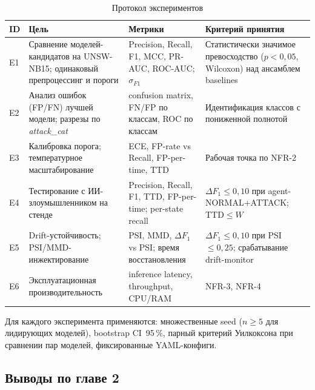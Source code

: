 \begin{table}[H]
\centering
\caption{Протокол экспериментов}
\label{tab:experiments}
\renewcommand{\arraystretch}{1.2}
\setlength{\tabcolsep}{4pt}
\small
\begin{tabularx}{\linewidth}{@{}lXXX@{}}
\toprule
\textbf{ID} & \textbf{Цель} & \textbf{Метрики} & \textbf{Критерий принятия} \\
\midrule
E1 &
Сравнение моделей-кандидатов на UNSW-NB15; одинаковый препроцессинг
и пороги &
Precision, Recall, F1, MCC, PR-AUC, ROC-AUC; $\sigma_{F1}$ &
Статистически значимое превосходство (\(p < 0{,}05\), Wilcoxon)
над ансамблем baselines \\
\addlinespace
E2 &
Анализ ошибок (FP/FN) лучшей модели; разрезы по \emph{attack\_cat} &
confusion matrix, FN/FP по классам, ROC по классам &
Идентификация классов с пониженной полнотой \\
\addlinespace
E3 &
Калибровка порога; температурное масштабирование &
ECE, FP-rate vs Recall, FP-per-time, TTD &
Рабочая точка по NFR-2 \\
\addlinespace
E4 &
Тестирование с ИИ-злоумышленником на стенде &
Precision, Recall, F1, TTD, FP-per-time; per-state recall &
$\Delta F_1 \leq 0{,}10$ при agent-NORMAL+ATTACK; TTD$\leq W$ \\
\addlinespace
E5 &
Drift-устойчивость; PSI/MMD-инжектирование &
PSI, MMD, $\Delta F_1$ vs PSI; время восстановления &
$\Delta F_1 \leq 0{,}10$ при PSI $\leq 0{,}25$;
срабатывание drift-monitor \\
\addlinespace
E6 &
Эксплуатационная производительность &
inference latency, throughput, CPU/RAM &
NFR-3, NFR-4 \\
\bottomrule
\end{tabularx}
\end{table}

Для каждого эксперимента применяются: множественные seed (\(n \geq 5\)
для лидирующих моделей), bootstrap CI~95\,\%, парный критерий
Уилкоксона при сравнении пар моделей, фиксированные YAML-конфиги.

\subsection*{Выводы по главе 2}

